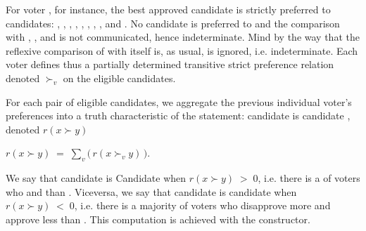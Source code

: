 \documentclass[a4paper,12pt,english]{sphinxhowto}
\begin{document}
\sphinxAtStartPar
For voter , for instance, the best approved candidate  is strictly preferred to candidates: , , , , , , , ,  and . No candidate is preferred to  and the comparison with , ,  and  is not communicated, hence indeterminate. Mind by the way that the reflexive comparison of  with itself is, as usual, is ignored, i.e. indeterminate. Each voter  defines thus a partially determined transitive strict preference relation denoted \(\succ_v\) on the eligible candidates.

\sphinxAtStartPar
For each pair of eligible candidates, we aggregate the previous individual voter’s preferences into a truth characteristic of the statement: candidate  is  candidate , denoted \(r(x \succ y)\)

\sphinxAtStartPar
\(r(x \succ y)\;=\; \sum_v \big(\,r(x \succ_v y)\, \big)\).

\sphinxAtStartPar
We say that candidate  is  Candidate  when \(r(x \succ y)\;>\;0\), i.e. there is a  of voters who   and    than . Vice\sphinxhyphen{}versa, we say that candidate  is  candidate  when \(r(x \succ y)\;<\;0\), i.e. there is a majority of voters who disapprove more and approve less  than . This computation is achieved with the  constructor.
\end{document}
